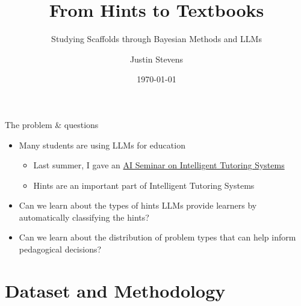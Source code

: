 \documentclass[10pt,aspectratio=169]{beamer}
\title[From Hints to Textbooks]{From Hints to Textbooks}
\subtitle{Studying Scaffolds through Bayesian Methods and LLMs}
\author{Justin Stevens}
\date{\today}
\begin{document}
\begin{frame}
  \titlepage
\end{frame}

\begin{frame}{The problem \& questions }
\begin{itemize}
    \item Many students are using LLMs for education 
    \begin{itemize} 
    \item Last summer, I gave an \href{https://www.youtube.com/watch?v=ECm2GY9uZN8}{AI Seminar on Intelligent Tutoring Systems}
    \item Hints are an important part of Intelligent Tutoring Systems
    \end{itemize} 
    \medskip \pause 
    \item Can we learn about the types of hints LLMs provide learners by automatically classifying the hints?
    \medskip \pause 
    \item Can we learn about the distribution of problem types that can help inform pedagogical decisions?
\end{itemize}
\end{frame}

\section{Dataset and Methodology}
\end{document}
